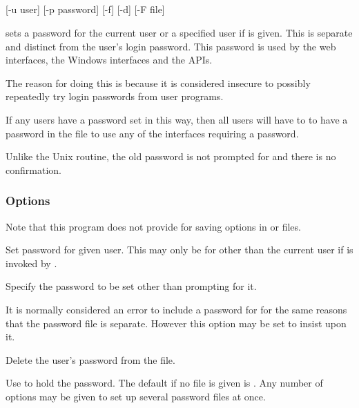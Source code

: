 \subsection{\XipasswdName}

\begin{expara}

\XipasswdName{} [-u user] [-p password] [-f] [-d] [-F file]

\end{expara}

\PrXipasswd{} sets a password for the current user or a specified user if  is given. This is
separate and distinct from the user's login password.
This password is used by the web interfaces, the Windows interfaces and
the APIs.

The reason for doing this is because it is considered insecure to possibly repeatedly try login passwords from user programs.

If any users have a password set in this way, then all users will have to to have a password in the file to use any of the interfaces
requiring a password.

Unlike the Unix  routine, the old password is not prompted for and there is no confirmation.

\subsubsection{Options}

Note that this program does not provide for saving options in \configurationfile{} or \homeconfigpath{} files.



Set password for given user. This may only be for other than the current user if \PrXipasswd{} is invoked by
.


Specify the password to be set other than prompting for it.


It is normally considered an error to include a password for  for the same reasons that the password file is
separate. However this option may be set to insist upon it.


Delete the user's password from the file.


Use  to hold the password. The default if no file is given
is . Any number of
 options may be given to set up several password files at once.

